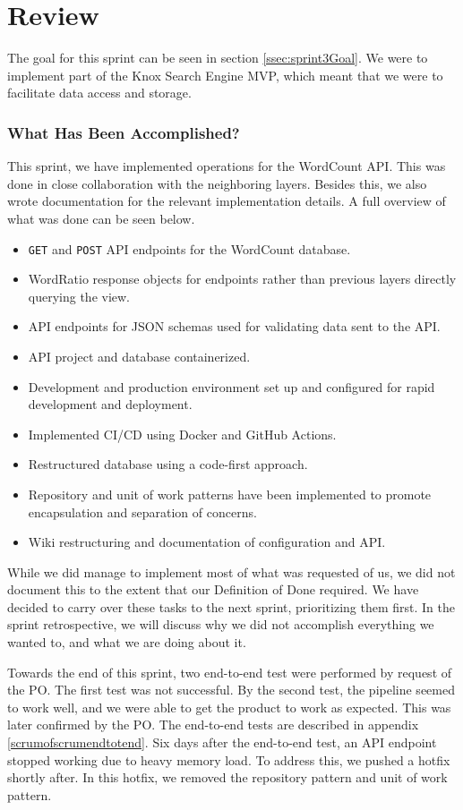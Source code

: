 \section{Review}
The goal for this sprint can be seen in section \ref{ssec:sprint3Goal}. We were to implement part of the Knox Search Engine MVP, which meant that we were to facilitate data access and storage.

\subsubsection{What Has Been Accomplished?}
This sprint, we have implemented operations for the WordCount API. This was done in close collaboration with the neighboring layers. 
Besides this, we also wrote documentation for the relevant implementation details. A full overview of what was done can be seen below.

\begin{itemize}
    \item \texttt{GET} and \texttt{POST} API endpoints for the WordCount database.
    \item WordRatio response objects for endpoints rather than previous layers directly querying the view.
    \item API endpoints for JSON schemas used for validating data sent to the API.
    \item API project and database containerized.
    \item Development and production environment set up and configured for rapid development and deployment.
    \item Implemented CI/CD using Docker and GitHub Actions.
    \item Restructured database using a code-first approach.
    \item Repository and unit of work patterns have been implemented to promote encapsulation and separation of concerns.
    \item Wiki restructuring and documentation of configuration and API.
\end{itemize}

While we did manage to implement most of what was requested of us, we did not document this to the extent that our Definition of Done required. 
We have decided to carry over these tasks to the next sprint, prioritizing them first. In the sprint retrospective, we will discuss why we did not accomplish everything we wanted to, and what we are doing about it.

Towards the end of this sprint, two end-to-end test were performed by request of the \knox{} PO. The first test was not successful.  By the second test, the pipeline seemed to work well, and we were able to get the product to work as expected. This was later confirmed by the PO. The end-to-end tests are described in appendix \ref{scrumofscrumendtotend}.
Six days after the end-to-end test, an API endpoint stopped working due to heavy memory load.
To address this, we pushed a hotfix shortly after. In this hotfix, we removed the repository pattern and unit of work pattern.


